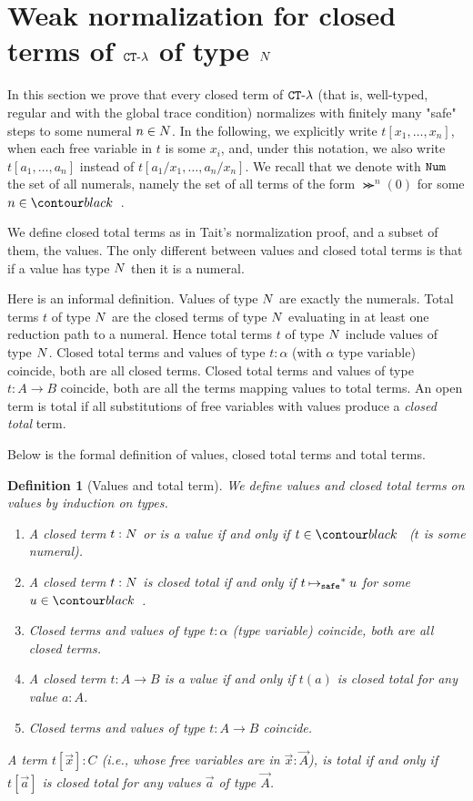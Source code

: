 \documentclass{article}
\newtheorem{definition}[theorem]{Definition}
\begin{document}

\section{Weak normalization for closed terms of ${ {\tt CT} \mbox{-} \lambda}$ of type ${N}$}
\label{section-weak-normalization}
In this section we prove that every closed term of ${ {\tt CT} \mbox{-} \lambda}$
 (that is, well-typed, regular and with the global trace condition) normalizes with finitely many "safe" steps
to some numeral $n \in {N}$.
In the following, we explicitly write $t[x_1,\ldots,x_n]$,
when each free variable in $t$ is some $x_i$, 
and, under this notation, we also write $t[a_1,\ldots,a_n]$ instead of $t[a_1/x_1,\ldots,a_n/x_n]$. 
We recall that we denote with ${\tt Num}$ the set of all numerals, namely the set of all terms of the form
$\Succ^n(0)$ for some $n\in \Nat$.

We define closed total terms as in Tait's normalization proof, and a subset of them, the values.
The only different between values and closed total terms 
is that if a value has type ${N}$ then it is a numeral.

Here is an informal definition. Values of type ${N}$ are exactly the numerals. 
Total terms $t$ of type ${N}$ are
the closed terms of type ${N}$ evaluating in at least one reduction path to a numeral. 
Hence total terms $t$ of type ${N}$ include values of type ${N}$. 
Closed total terms and values of type $t:\alpha$ (with $\alpha$ type variable) coincide, 
both are all closed terms.
Closed total terms and values of type $t:A \rightarrow B$ coincide, 
both are all the terms mapping values to total terms. 
An open term is total if all substitutions of free variables with values produce a \emph{closed total} term.

Below is the formal definition of values, closed total terms and total terms.

\begin{definition}[Values and total term]
  We define values and closed total terms on values by induction on types. 
  \begin{enumerate}
  \item
    A closed term $t:{N}$ or is a \emph{value} if and only if $t \in \Nat$ ($t$ is some numeral).
  \item
    A closed term $t:{N}$ is \emph{closed total}
    if and only if $t \mathbin{{\mapsto}_{\tiny \tt safe}}^* u$ for some $u\in \Nat$.
  \item
    Closed terms and values of type $t:\alpha$ (type variable) coincide, both are all closed terms.
   \item
    A closed term $t:A\rightarrow B$ is a \emph{value}
    if and only if $t(a)$ is closed total for any value $a:A$.
   \item
    Closed terms and values of type  $t:A\rightarrow B$ coincide.
   \end{enumerate}
   A term $t[\vec{x}]:C$ (i.e., whose free variables are in $\vec{x}:\vec{A}$), is
    \emph{total} if and only if $t[\vec{a}]$ is closed total for any values $\vec{a}$ of type $\vec{A}$.
\end{definition}
\end{document}
